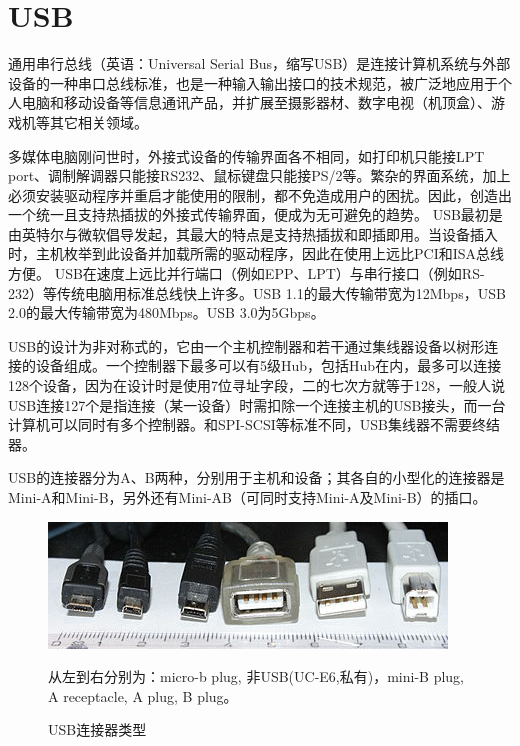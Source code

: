 

\section{USB}

通用串行总线（英语：Universal Serial Bus，缩写USB）是连接计算机系统与外部设备的一种串口总线标准，也是一种输入输出接口的技术规范，被广泛地应用于个人电脑和移动设备等信息通讯产品，并扩展至摄影器材、数字电视（机顶盒）、游戏机等其它相关领域。

多媒体电脑刚问世时，外接式设备的传输界面各不相同，如打印机只能接LPT port、调制解调器只能接RS232、鼠标键盘只能接PS/2等。繁杂的界面系统，加上必须安装驱动程序并重启才能使用的限制，都不免造成用户的困扰。因此，创造出一个统一且支持热插拔的外接式传输界面，便成为无可避免的趋势。
USB最初是由英特尔与微软倡导发起，其最大的特点是支持热插拔和即插即用。当设备插入时，主机枚举到此设备并加载所需的驱动程序，因此在使用上远比PCI和ISA总线方便。
USB在速度上远比并行端口（例如EPP、LPT）与串行接口（例如RS-232）等传统电脑用标准总线快上许多。USB 1.1的最大传输带宽为12Mbps，USB 2.0的最大传输带宽为480Mbps。USB 3.0为5Gbps。

USB的设计为非对称式的，它由一个主机控制器和若干通过集线器设备以树形连接的设备组成。一个控制器下最多可以有5级Hub，包括Hub在内，最多可以连接128个设备，因为在设计时是使用7位寻址字段，二的七次方就等于128，一般人说USB连接127个是指连接（某一设备）时需扣除一个连接主机的USB接头，而一台计算机可以同时有多个控制器。和SPI-SCSI等标准不同，USB集线器不需要终结器。

USB的连接器分为A、B两种，分别用于主机和设备；其各自的小型化的连接器是Mini-A和Mini-B，另外还有Mini-AB（可同时支持Mini-A及Mini-B）的插口。
\begin{figure}[ht]
	\begin{center}
		\includegraphics[keepaspectratio,width=0.5\paperwidth]{Hardwares/usb-connectors.jpg}
	\caption{USB连接器类型}
	从左到右分别为：micro-b plug, 非USB(UC-E6,私有)，mini-B plug, A receptacle, A plug, B plug。
	\label{fig:USBconnectors}
	\end{center}
\end{figure}

